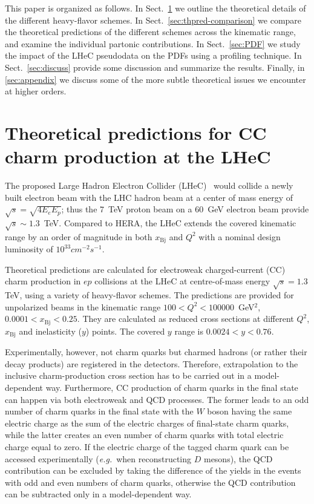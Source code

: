 \documentclass[pdftex,twocolumn,epjc3]{svjour3}          %
\newcommand{\xbj}{\ensuremath{x_{\text{Bj}}}\xspace}
\begin{document}
This paper is organized as follows.
%
In Sect.~\ref{sec:thpred} we outline the theoretical details of the
different heavy-flavor schemes.
%
In Sect.~\ref{sec:thpred-comparison} we compare the theoretical
predictions of the different schemes across the kinematic range, and
examine the individual partonic contributions.
%
In Sect.~\ref{sec:PDF} we study the impact of the LHeC pseudodata on
the PDFs using a profiling technique.
%
In Sect.~\ref{sec:discuss} provide some discussion and summarize the
results.
%
Finally, in \ref{sec:appendix} we discuss some of the more subtle
theoretical issues we encounter at higher orders.

\section{Theoretical predictions for CC charm production at the LHeC} \label{sec:thpred}

The proposed Large Hadron Electron Collider
(LHeC)~\cite{AbelleiraFernandez:2012cc} would collide a newly built
electron beam with the LHC hadron beam at a center of mass energy of
$\sqrt{s} = \sqrt{4 E_e E_p}$; thus the 7~TeV proton beam on a 60~GeV
electron beam provide $\sqrt{s}\sim 1.3$~TeV.
%
Compared to HERA, the LHeC extends the covered kinematic range by an
order of magnitude in both \xbj and $Q^2$ with a nominal design
luminosity of $10^{33} cm^{-2} s^{-1}$.


Theoretical predictions are calculated for electroweak charged-current
(CC) charm production in $ep$ collisions at the LHeC at centre-of-mass
energy $\sqrt{s} = 1.3$ TeV, using a variety of heavy-flavor
schemes. The predictions are provided for unpolarized beams in the
kinematic range $100 < Q^2 < 100000$~GeV$^2$, $0.0001 < \xbj < 0.25$.
They are calculated as reduced cross sections at different $Q^2$, \xbj
and inelasticity ($y$) points. 
The covered $y$ range is $0.0024 < y < 0.76$.

Experimentally, however, not charm quarks but charmed hadrons (or
rather their decay products) are registered in the detectors.
Therefore, extrapolation to the inclusive charm-production cross
section has to be carried out in a model-dependent way. Furthermore,
CC production of charm quarks in the final state can happen via both
electroweak and QCD processes.  The former leads to an odd number of
charm quarks in the final state with the $W$ boson having the same
electric charge as the sum of the electric charges of final-state
charm quarks, while the latter creates an even number of charm quarks
with total electric charge equal to zero. If the electric charge of
the tagged charm quark can be accessed experimentally
(\textit{e.g.}~when reconstructing $D$ mesons), the QCD contribution
can be excluded by taking the difference of the yields in the events
with odd and even numbers of charm quarks, otherwise the QCD
contribution can be subtracted only in a model-dependent way.
\end{document}

